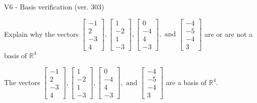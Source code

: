 \begin{exercise}
  \begin{exerciseTitle}V6 - Basis verification (ver. 303)\end{exerciseTitle}
  \begin{exerciseStatement}
    Explain why the vectors \(\left[\begin{array}{r}
-1 \\
2 \\
-3 \\
4
\end{array}\right] , \left[\begin{array}{r}
1 \\
-2 \\
1 \\
-3
\end{array}\right] , \left[\begin{array}{r}
0 \\
-4 \\
4 \\
-3
\end{array}\right] , \text{ and } \left[\begin{array}{r}
-4 \\
-5 \\
-4 \\
3
\end{array}\right]\) are or are not a basis of \(\mathbb{R}^4\)	


  \end{exerciseStatement}
  \begin{exerciseAnswer}
   The vectors \(\left[\begin{array}{r}
-1 \\
2 \\
-3 \\
4
\end{array}\right] , \left[\begin{array}{r}
1 \\
-2 \\
1 \\
-3
\end{array}\right] , \left[\begin{array}{r}
0 \\
-4 \\
4 \\
-3
\end{array}\right] , \text{ and } \left[\begin{array}{r}
-4 \\
-5 \\
-4 \\
3
\end{array}\right]\) 
  	 are  a basis of \(\mathbb{R}^4\).
  


  \end{exerciseAnswer}
\end{exercise}